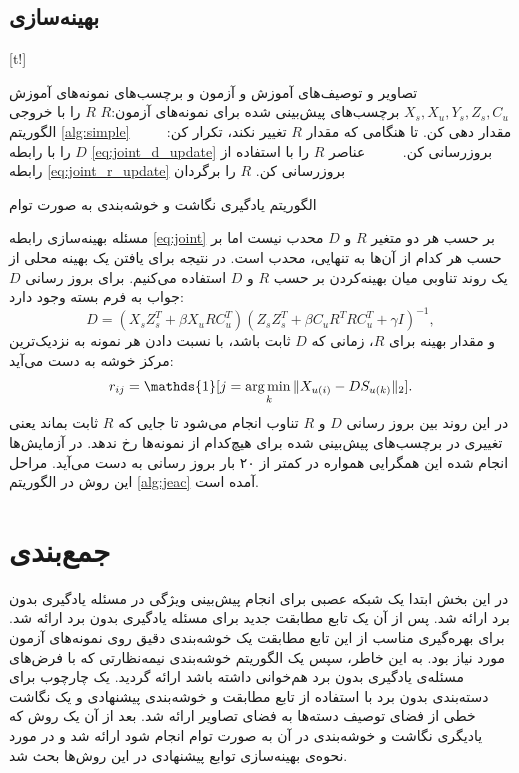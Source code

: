 \subsection{بهینه‌سازی}

[t!]
	\begin{enumerate}[label={\arabic*},itemsep=.1em, parsep=.1em]
 تصاویر و توصیف‌های آموزش و آزمون و برچسب‌های نمونه‌های آموزش $X_s, X_u, Y_s, Z_s, C_u$
 برچسب‌های پیش‌بینی شده برای نمونه‌های آزمون:$R$
 $R$ را با خروجی الگوریتم \ref{alg:simple} مقدار دهی کن.
 تا هنگامی که مقدار $R$ تغییر نکند،  تکرار کن:
 $\qquad$  $D$ را با رابطه \eqref{eq:joint_d_update} بروزرسانی کن.
 $\qquad$ عناصر $R$ را با استفاده از رابطه \eqref{eq:joint_r_update} بروزرسانی کن.
 $R$ را برگردان
\end{enumerate}
\caption{الگوریتم یادگیری نگاشت و خوشه‌بندی به صورت توام}
\label{alg:jeac}

مسئله بهینه‌سازی رابطه \eqref{eq:joint} بر حسب هر دو متغیر $R$ و $D$ محدب  نیست اما بر حسب هر کدام از آن‌ها به تنهایی، محدب است. در نتیجه برای یافتن یک بهینه محلی از یک روند تناوبی میان بهینه‌کردن بر حسب $R$ و $D$ استفاده می‌کنیم.
برای بروز رسانی $D$ جواب به فرم بسته وجود دارد:
\begin{equation} \label{eq:joint_d_update}
  D = (X_s Z_s^T + \beta X_u R C_u^T) (Z_s Z_s^T + \beta C_u R^T R C_u^T  + \gamma I)^{-1},
\end{equation}
و مقدار بهینه برای $R$، زمانی که $D$ ثابت باشد، با نسبت دادن هر نمونه به نزدیک‌ترین مرکز خوشه به دست می‌آید:
\begin{equation} \label{eq:joint_r_update}
  r_{ij} = \mathds{1}[j = \argmin_{k} \lVert X_{u(i)} - D S_{u(k)} \rVert_2 ].
\end{equation}
در این روند بین بروز رسانی $D$ و $R$ تناوب انجام می‌شود تا جایی که $R$ ثابت بماند یعنی تغییری در برچسب‌های پیش‌بینی شده برای هیچ‌کدام از نمونه‌ها رخ ندهد. در آزمایش‌ها انجام شده این همگرایی همواره در کمتر از ۲۰ بار بروز رسانی به دست می‌آید.
مراحل این روش در الگوریتم \ref{alg:jeac} آمده است.
\section{جمع‌بندی}
در این بخش ابتدا یک شبکه عصبی برای انجام پیش‌بینی ویژگی در مسئله یادگیری بدون برد ارائه شد. پس از آن یک تابع مطابقت جدید برای مسئله یادگیری بدون برد ارائه شد. برای بهره‌گیری مناسب از این تابع مطابقت یک خوشه‌بندی دقیق روی نمونه‌های آزمون مورد نیاز بود. به این خاطر، سپس یک الگوریتم خوشه‌بندی نیمه‌نظارتی که با فرض‌های مسئله‌ی یادگیری بدون برد هم‌خوانی داشته باشد ارائه گردید. یک چارچوب برای دسته‌بندی بدون برد با استفاده از تابع مطابقت و خوشه‌بندی پیشنهادی و یک نگاشت خطی از فضای توصیف دسته‌ها به فضای تصاویر ارائه شد. بعد از آن یک روش که یادیگری نگاشت و خوشه‌بندی در آن  به صورت توام انجام شود ارائه شد و در مورد نحوه‌ی بهینه‌سازی توابع پیشنهادی در این روش‌ها بحث شد.
